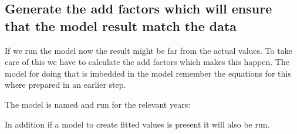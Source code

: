 \documentclass[letterpaper,10pt,english]{jupyterBook}
\begin{document}
\subsection{Generate the add factors which will ensure that the model result match the data}
\label{\detokenize{content/howto/smallmodel/modelstart:generate-the-add-factors-which-will-ensure-that-the-model-result-match-the-data}}
\sphinxAtStartPar
If we run the model now the result might be far from the actual values. To take care of this we have to calculate the add factors which makes this happen. The model for doing that is imbedded in the model \sphinxhyphen{} remember the equations for this where prepared in an earlier step.

\sphinxAtStartPar
The model is named  and run for the relevant years:

\sphinxAtStartPar
In addition if a model to create fitted values is present it will also be run.
\end{document}
